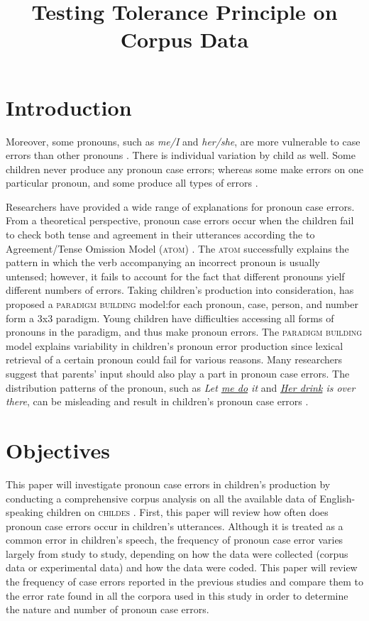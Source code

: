 \documentclass[a4paper,12pt]{article}
\title{Testing Tolerance Principle on Corpus Data}
\author{ }
\date{}
\begin{document}
\maketitle

\section{Introduction}
 Moreover, some pronouns, such as \textit{me/I} and \textit{her/she}, are more vulnerable to case errors than other pronouns \citep[e.g.][]{schutze1996subject,rispoli1998,rispoli1999,pine2005testing}. There is individual variation by child as well. Some children never produce any pronoun case errors; whereas some make errors on one particular pronoun, and some produce all types of errors \citep{rispoli2005}.  

Researchers have provided a wide range of explanations for pronoun case errors. From a theoretical perspective, pronoun case errors occur when the children fail to check both tense and agreement in their utterances according the to Agreement/Tense Omission Model (\textsc{atom}) \citep{wexler1998very,wexler1998subject}. The \textsc{atom} successfully explains the pattern in which the verb accompanying an incorrect pronoun is usually untensed; however, it fails to account for the fact that different pronouns yielf different numbers of errors. Taking children's production into consideration,  \cite{rispoli1998,rispoli1999,rispoli2005} has proposed a  \textsc{paradigm building} model:for each pronoun, case, person, and number form a 3x3 paradigm. Young children have difficulties accessing all forms of pronouns in the paradigm, and thus make pronoun errors. The \textsc{paradigm building} model explains variability in children's pronoun error production since lexical retrieval of a certain pronoun could fail for various reasons. Many researchers suggest that parents' input should also play a part in pronoun case errors. The distribution patterns of the pronoun, such as \textit{Let \underline{me do} it} and \textit{\underline{Her drink} is over there}, can be misleading and result in children's pronoun case errors \citep[e.g.][]{budwig1996influences,tomasello2000,tomasello2003, ambridge2006testing,kirjavainen2009can}.

\section{Objectives}
This paper will investigate pronoun case errors in children's production by conducting a comprehensive corpus analysis on all the available data of English-speaking children on \textsc{childes} \citep{macwhinney2014childes}. First, this paper will review how often does pronoun case errors occur in children's utterances. Although it is treated as a common error in children's speech, the frequency of pronoun case error varies largely from study to study, depending on how the data were collected (corpus data or experimental data) and how the data were coded. This paper will review the frequency of case errors reported in the previous studies and compare them to the error rate found in all the corpora used in this study in order to determine the nature and number of pronoun case errors.
\end{document}
